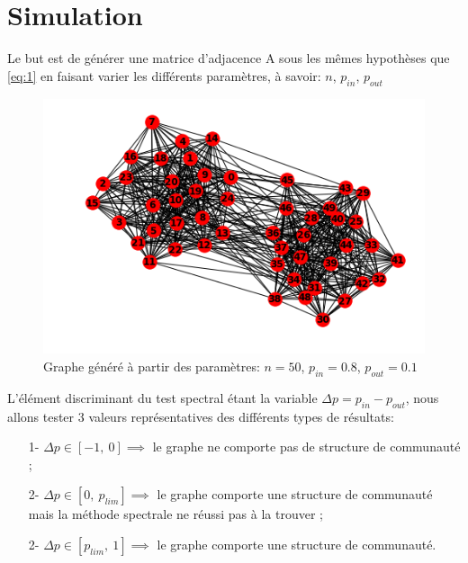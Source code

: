 \section{Simulation}
Le but est de générer une matrice d'adjacence A sous les mêmes hypothèses que \eqref{eq:1} en faisant varier les différents paramètres, à savoir: $n$, $p_{in}$, $p_{out}$ \\

\begin{figure}[h]
\centering
\includegraphics[scale=0.6]{static/graph_n50_pin08_pout01.png}
\caption{Graphe généré à partir des paramètres: $n=50$, $p_{in}=0.8$, $p_{out}=0.1$}
\end{figure}

L'élément discriminant du test spectral étant la variable $ \Delta p= p_{in} - p_{out}$, nous allons tester 3 valeurs représentatives des différents types de résultats:
\begin{itemize}
	\item[1-] $\Delta p \in [-1,\: 0] \implies$ le graphe ne comporte pas de structure de communauté ;
	\item[2-] $\Delta p \in [0,\: p_{lim}] \implies$ le graphe comporte une structure de communauté mais la méthode spectrale ne réussi pas à la trouver ;
	\item[2-] $\Delta p \in [p_{lim},\: 1] \implies$ le graphe comporte une structure de communauté.\\
\end{itemize}

